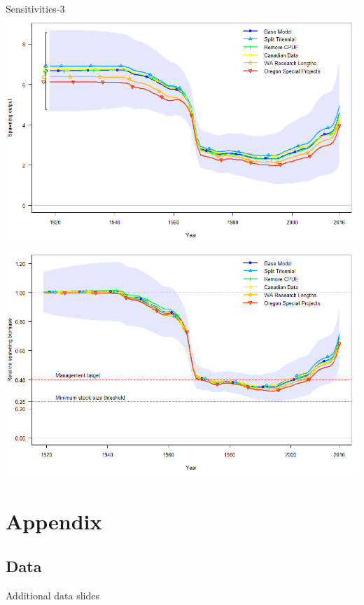 \documentclass[pdf]{beamer}\usepackage[]{graphicx}\usepackage[]{color}
\begin{document}
\begin{frame}{Sensitivities-3}
    \includegraphics[scale = 0.20]{figures/ssb_sens2.png}
    \includegraphics[scale = 0.20]{figures/depl_sens2.png}
\end{frame}


\begin{frame}

\end{frame}

\section*{Appendix}
\subsection*{Data}
\begin{frame}
  \Huge{\centerline{Additional data slides}}
\end{frame}
\end{document}
